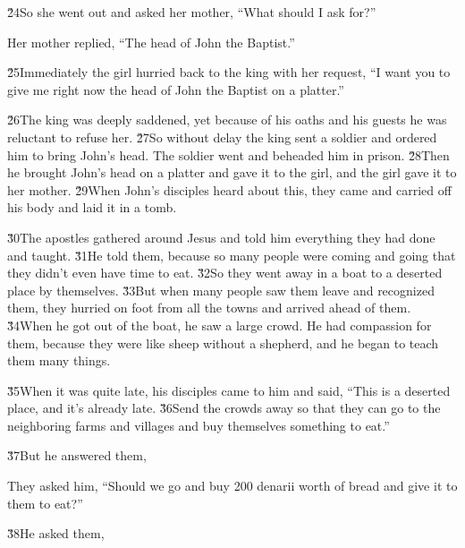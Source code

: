 \v{24}So she went out and asked her mother, ``What should I ask for?''

Her mother replied, ``The head of John the Baptist.''

\v{25}Immediately the girl hurried back to the king with her request, ``I want you to give me right now the head of John the Baptist on a platter.''

\v{26}The king was deeply saddened, yet because of his oaths and his guests he was reluctant to refuse her. \v{27}So without delay the king sent a soldier and ordered him to bring John's head. The soldier went and beheaded him in prison. \v{28}Then he brought John's head on a platter and gave it to the girl, and the girl gave it to her mother. \v{29}When John's disciples heard about this, they came and carried off his body and laid it in a tomb.

\v{30}The apostles gathered around Jesus and told him everything they had done and taught. \v{31}He told them,  because so many people were coming and going that they didn't even have time to eat. \v{32}So they went away in a boat to a deserted place by themselves. \v{33}But when many people saw them leave and recognized them, they hurried on foot from all the towns and arrived ahead of them. \v{34}When he got out of the boat, he saw a large crowd. He had compassion for them, because they were like sheep without a shepherd, and he began to teach them many things.

\v{35}When it was quite late, his disciples came to him and said, ``This is a deserted place, and it's already late. \v{36}Send the crowds away so that they can go to the neighboring farms and villages and buy themselves something to eat.''

\v{37}But he answered them, 

They asked him, ``Should we go and buy 200 denarii worth of bread and give it to them to eat?''

\v{38}He asked them, 

